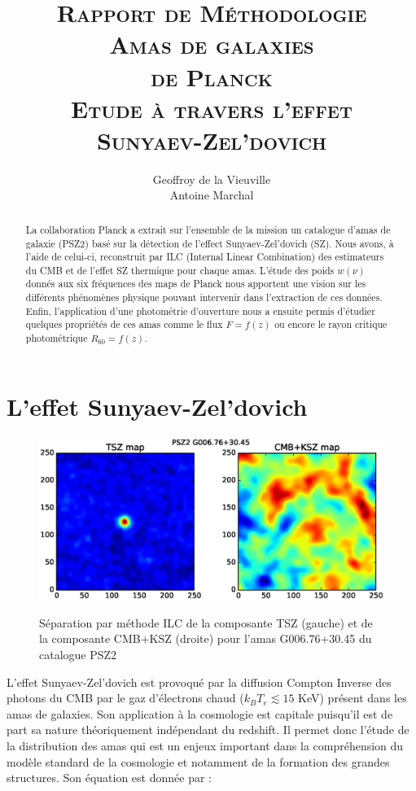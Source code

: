 \documentclass[a4paper,11pt]{article}
\title{{\textsc{\Large{Rapport de Méthodologie}\\ [3cm]
      \textbf{\LARGE{Amas de galaxies \\ de Planck}} \\ [0.6cm] 
Etude à travers l'effet \\ Sunyaev-Zel’dovich}} \\[2cm]}
\author{Geoffroy de la Vieuville \\ Antoine Marchal}
\date{}
\begin{document}
\begin{titlingpage}
\maketitle
\begin{abstract}
  La collaboration Planck a extrait sur l'ensemble de la mission un
  catalogue d'amas de galaxie (PSZ2) basé sur la détection de l'effect
  Sunyaev-Zel’dovich (SZ). Nous avons, à l'aide de celui-ci,
  reconstruit par ILC (Internal Linear Combination) des estimateurs du
  CMB et de l'effet SZ thermique pour chaque amas. 
  L'étude des poids $w(\nu)$ donnés aux six fréquences des 
  maps de Planck nous apportent une vision sur les différents
  phénomènes physique pouvant intervenir dans l'extraction de ces données. Enfin,
  l'application d'une photométrie d'ouverture nous a ensuite permis 
  d'étudier quelques propriétés de ces amas comme le flux $F=f(z)$ 
  ou encore le rayon critique photométrique $R_{60}=f(z)$.
\end{abstract}
\end{titlingpage}

\newpage

\section{L'effet Sunyaev-Zel’dovich}

\begin{figure}[b!]
  \centering
  \includegraphics[width=4.5in]{sz_effect.eps}
  \label{sz_effect}
  \caption{Séparation par méthode ILC de la composante TSZ (gauche) et de la
    composante CMB+KSZ (droite) pour l'amas G006.76+30.45 du catalogue
  PSZ2}
\end{figure}

L'effet Sunyaev-Zel’dovich \cite{Sunyaev} est provoqué par la diffusion Compton
Inverse des photons du CMB par le gaz d'électrons chaud ($k_B T_e
\lesssim 15$ KeV) présent dans les amas de galaxies. Son application à
la cosmologie est capitale puisqu'il est de part sa nature
théoriquement indépendant du redshift. Il permet donc l'étude de la
distribution des amas qui est un enjeux important dans la
compréhension du modèle standard de la cosmologie et notamment de la
formation des grandes structures. Son équation est donnée par : 
\end{document}
